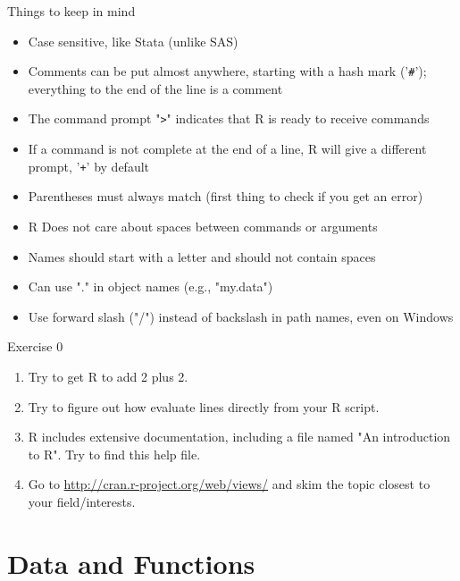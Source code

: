 \documentclass[table,smaller]{beamer}
\begin{document}
\begin{frame}[fragile,label=sec-2-6]{Things to keep in mind}
 \begin{itemize}
\item Case sensitive, like Stata (unlike SAS)

\item Comments can be put almost anywhere, starting with a hash mark ('\texttt{\#}'); everything to the end of the line is a comment

\item The command prompt "\texttt{>}" indicates that R is ready to receive commands

\item If a command is not complete at the end of a line, R will give a different prompt, '\texttt{+}' by default

\item Parentheses must always match (first thing to check if you get an error)

\item R Does not care about spaces between commands or arguments

\item Names should start with a letter and should not contain spaces

\item Can use "." in object names (e.g., "my.data")

\item Use forward slash ("/") instead of backslash in path names, even on Windows
\end{itemize}
\end{frame}


\begin{frame}[label=sec-2-7]{Exercise 0}
\begin{enumerate}
\item Try to get R to add 2 plus 2.
\item Try to figure out how evaluate lines directly from your R script.
\item R includes extensive documentation, including a file named "An introduction to R". Try to find this help file.
\item Go to \url{http://cran.r-project.org/web/views/} and skim the topic closest to your field/interests.
\end{enumerate}
\end{frame}


\section{Data and Functions}
\label{sec-3}
\end{document}
